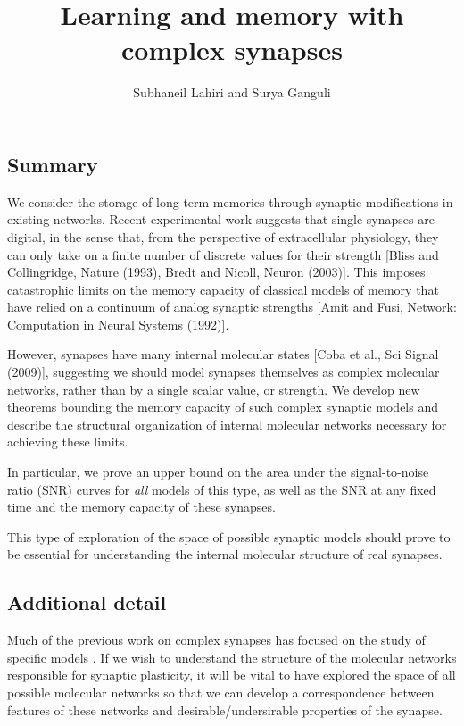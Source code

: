 \documentclass[12pt]{article}
\title{Learning and memory with complex synapses}
\author{Subhaneil Lahiri and Surya Ganguli}
\date{}
\begin{document}
\maketitle



\subsection*{Summary}

We consider the storage of long term memories through synaptic modifications in existing networks.
Recent experimental work suggests that single synapses are digital, in the sense that, from the perspective of extracellular physiology, they can only take on a finite number of discrete values for their strength [Bliss and Collingridge, Nature (1993), Bredt and Nicoll, Neuron (2003)]\nocite{Bliss1993,*Bredt2003361}.
This imposes catastrophic limits on the memory capacity of classical models of memory that have relied on a continuum of analog synaptic strengths [Amit and Fusi, Network: Computation in Neural Systems (1992)]\nocite{amit1992constraints}.

However, synapses have many internal molecular states [Coba et al., Sci Signal (2009)]\nocite{Coba2009phosphorylation}, suggesting we should model synapses themselves as complex molecular networks, rather than by a single scalar value, or strength.
We develop new theorems bounding the memory capacity of such complex synaptic models and describe the structural organization of internal molecular networks necessary for achieving these limits.

In particular, we prove an upper bound on the area under the signal-to-noise ratio (SNR) curves for \emph{all} models of this type, as well as the SNR at any fixed time and the memory capacity of these synapses.

This type of exploration of the space of possible synaptic models should prove to be essential for understanding the internal molecular structure of real synapses.

\subsection*{Additional detail}

Much of the previous work on complex synapses has focused on the study of specific models \cite{amit1994learning,*Fusi2005cascade,*Fusi2007multistate}.
If we wish to understand the structure of the molecular networks responsible for synaptic plasticity, it will be vital to have explored the space of all possible molecular networks so that we can develop a correspondence between features of these networks and desirable/undersirable properties of the synapse.
\end{document}
